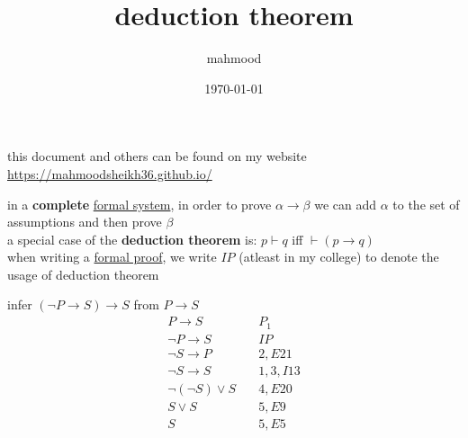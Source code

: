 \documentclass[a4paper,12pt]{article}
\author{mahmood}
\date{\today}
\title{deduction theorem}
\begin{document}
\maketitle
\begin{note}
this document and others can be found on my website\\
\url{https://mahmoodsheikh36.github.io/}
\end{note}
in a \textbf{complete} \href{20230524203100-formal_system.org}{formal system}, in order to prove \(\alpha \to \beta\) we can add \(\alpha\) to the set of assumptions and then prove \(\beta\)\\[0pt]
a special case of the \textbf{deduction theorem} is: \(p \vdash q\) iff \(\vdash (p \to q)\)\\[0pt]
when writing a \href{20230525071323-formal_proof.org}{formal proof}, we write \(IP\) (atleast in my college) to denote the usage of deduction theorem\\[0pt]
\begin{my_example}
infer \((\lnot P \to S) \to S\) from \(P \to S\)\\[0pt]
\begin{align}
  P \to S &\quad P_1\\
  \lnot P \to S &\quad IP\\
  \lnot S \to P &\quad 2,E21\\
  \lnot S \to S &\quad 1,3,I13\\
  \lnot (\lnot S) \lor S &\quad 4,E20\\
  S \lor S &\quad 5,E9\\
  S &\quad 5,E5
\end{align}
\end{my_example}
\end{document}
